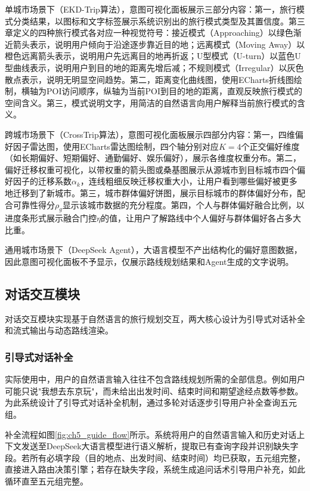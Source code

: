 单城市场景下（EKD-Trip算法），意图可视化面板展示三部分内容：第一，旅行模式分类结果，以图标和文字标签展示系统识别出的旅行模式类型及其置信度。第三章定义的四种旅行模式各对应一种视觉符号：接近模式（Approaching）以绿色渐近箭头表示，说明用户倾向于沿途逐步靠近目的地；远离模式（Moving Away）以橙色远离箭头表示，说明用户先远离目的地再折返；U型模式（U-turn）以蓝色U型曲线表示，说明用户到目的地的距离先增后减；不规则模式（Irregular）以灰色散点表示，说明无明显空间趋势。第二，距离变化曲线图，使用ECharts折线图绘制，横轴为POI访问顺序，纵轴为当前POI到目的地的距离，直观反映旅行模式的空间含义。第三，模式说明文字，用简洁的自然语言向用户解释当前旅行模式的含义。

跨城市场景下（CrossTrip算法），意图可视化面板展示四部分内容：第一，四维偏好因子雷达图，使用ECharts雷达图绘制，四个轴分别对应$K=4$个正交偏好维度（如长期偏好、短期偏好、通勤偏好、娱乐偏好），展示各维度权重分布。第二，偏好迁移权重可视化，以带权重的箭头图或桑基图展示从源城市到目标城市四个偏好因子的迁移系数$\alpha_k$，连线粗细反映迁移权重大小，让用户看到哪些偏好被更多地迁移到了新城市。第三，城市群体偏好饼图，展示目标城市的群体偏好分布，配合可靠性得分$\rho_g$显示该城市数据的充分程度。第四，个人与群体偏好融合比例，以进度条形式展示融合门控$\eta$的值，让用户了解路线中个人偏好与群体偏好各占多大比重。

通用城市场景下（DeepSeek Agent），大语言模型不产出结构化的偏好意图数据，因此意图可视化面板不予显示，仅展示路线规划结果和Agent生成的文字说明。

\subsection{对话交互模块}
\label{sec:ch5_dialog}

对话交互模块实现基于自然语言的旅行规划交互，两大核心设计为引导式对话补全和流式输出与动态路线渲染。

\subsubsection{引导式对话补全}

实际使用中，用户的自然语言输入往往不包含路线规划所需的全部信息。例如用户可能只说"我想去东京玩"，而未给出出发时间、结束时间和期望途经点数等参数。为此系统设计了引导式对话补全机制，通过多轮对话逐步引导用户补全查询五元组。

补全流程如图\ref{fig:ch5_guide_flow}所示。系统将用户的自然语言输入和历史对话上下文发送至DeepSeek大语言模型进行语义解析，提取已有查询字段并识别缺失字段。若所有必填字段（目的地点、出发时间、结束时间）均已获取，五元组完整，直接进入路由决策引擎；若存在缺失字段，系统生成追问话术引导用户补充，如此循环直至五元组完整。

